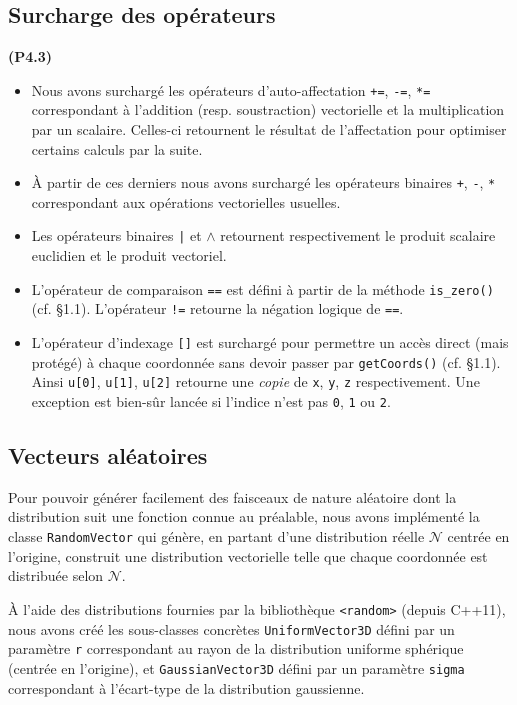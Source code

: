 \documentclass[12pt, letterpaper, twoside]{article}
\newcommand{\T}[1]{\texttt{#1}}
\begin{document}
\subsection{Surcharge des opérateurs}
\noindent \textbf{(P4.3)}
\begin{itemize}
\item Nous avons surchargé les opérateurs d'auto-affectation \T{+=}, \T{-=}, \T{*=} correspondant à l'addition (resp. soustraction) vectorielle et la multiplication par un scalaire. Celles-ci retournent le résultat de l'affectation pour optimiser certains calculs par la suite.

\item À partir de ces derniers nous avons surchargé les opérateurs binaires \T{+}, \T{-}, \T{*} correspondant aux opérations vectorielles usuelles.

\item Les opérateurs binaires \T{|} et \T{$\wedge$} retournent respectivement le produit scalaire euclidien et le produit vectoriel.

\item L'opérateur de comparaison \T{==} est défini à partir de la méthode \T{is\_zero()} (cf. \S1.1). L'opérateur \T{!=} retourne la négation logique de \T{==}.

\item L'opérateur d'indexage \T{[]} est surchargé pour permettre un accès direct (mais protégé) à chaque coordonnée sans devoir passer par \T{getCoords()} (cf. \S1.1). Ainsi \T{u[0]}, \T{u[1]}, \T{u[2]} retourne une \textit{copie} de \T{x}, \T{y}, \T{z} respectivement. Une exception est bien-sûr lancée si l'indice n'est pas \T{0}, \T{1} ou \T{2}.
\end{itemize}

\subsection{Vecteurs aléatoires}
\noindent Pour pouvoir générer facilement des faisceaux de nature aléatoire dont la distribution suit une fonction connue au préalable, nous avons implémenté la classe \T{RandomVector} qui génère, en partant d'une distribution réelle $\mathcal{N}$ centrée en l'origine, construit une distribution vectorielle telle que chaque coordonnée est distribuée selon $\mathcal{N}$.

À l'aide des distributions fournies par la bibliothèque \T{<random>} (depuis C++11), nous avons créé les sous-classes concrètes \T{UniformVector3D} défini par un paramètre \T{r} correspondant au rayon de la distribution uniforme sphérique (centrée en l'origine), et \T{GaussianVector3D} défini par un paramètre \T{sigma} correspondant à l'écart-type de la distribution gaussienne.
\end{document}
